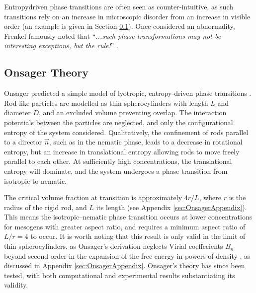 \documentclass[11pt, a4paper]{article} %
\begin{document}
Entropy\textendash driven phase transitions are often seen as counter-intuitive, as such transitions rely on an increase in microscopic disorder from an increase in visible order (an example is given in Section \ref{sec:OnsagerTheory}). Once considered an abnormality, Frenkel famously noted that ``\textit{...such phase transformations may not be interesting exceptions, but the rule!}'' \cite{Frenkel1999}.

\subsection{Onsager Theory} \label{sec:OnsagerTheory}

Onsager predicted a simple model of lyotropic, entropy-driven phase transitions \cite{Onsager1949}. Rod-like particles are modelled as thin spherocylinders with length $L$ and diameter $D$, and an excluded volume preventing overlap. The interaction potentials between the particles are neglected, and only the configurational entropy of the system considered. Qualitatively, the confinement of rods parallel to a director $\Vec{n}$, such as in the nematic phase, leads to a decrease in rotational entropy, but an increase in translational entropy allowing rods to move freely parallel to each other. At sufficiently high concentrations, the translational entropy will dominate, and the system undergoes a phase transition from isotropic to nematic. 

The critical volume fraction at transition is approximately $4r/L$, where $r$ is the radius of the rigid rod, and $L$ its length (see Appendix \ref{sec:OnsagerAppendix}). This means the isotropic--nematic phase transition occurs at lower concentrations for mesogens with greater aspect ratio, and requires a minimum aspect ratio of $L/r = 4$ to occur. It is worth noting that this result is only valid in the limit of thin spherocylinders, as Onsager's derivation neglects Virial coeffecients $B_{n}$ beyond second order in the expansion of the free energy in powers of density \cite{Frenkel1987}, as discussed in Appendix \ref{sec:OnsagerAppendix}. Onsager's theory has since been tested, with both computational \cite{Frenkel1987b, Frenkel1988b} and experimental \cite{Kubo1979,Oldenbourg1988,Fraden1993} results substantiating its validity.

\end{document}
